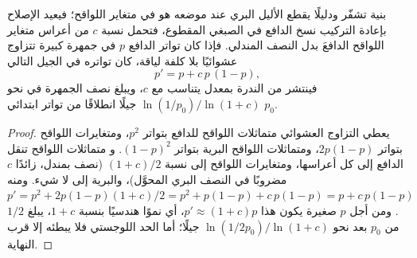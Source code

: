 \begin{theorem}\label{thm:b3:genetic-engineering:drive}
\emph{} بنية تشفّر  ودليلًا يقطع
الأليل البري عند موضعه هو في متغاير اللواقح؛ فيعيد الإصلاح
بإعادة التركيب نسخ الدافع في الصبغي المقطوع، فتحمل
نسبة $c$ من أعراس متغاير اللواقح الدافعَ بدل
النصف المندلي. فإذا كان تواتر الدافع $p$ في جمهرة كبيرة
تتزاوج عشوائيًا بلا كلفة لياقة، كان تواتره في
الجيل التالي
\[
p' = p + c\,p\,(1 - p),
\]
فينتشر من الندرة بمعدل يتناسب مع $c$، ويبلغ
نصف الجمهرة في نحو $\ln(1/p_{0})/\ln(1 + c)$
جيلًا انطلاقًا من تواتر ابتدائي $p_{0}$.
\end{theorem}
\begin{proof}
يعطي التزاوج العشوائي متماثلات اللواقح للدافع بتواتر $p^{2}$،
ومتغايرات اللواقح بتواتر $2p(1-p)$، ومتماثلات اللواقح البرية بتواتر $(1-p)^{2}$. و
متماثلات اللواقح تنقل الدافع إلى كل أعراسها، ومتغايرات اللواقح
إلى نسبة $(1 + c)/2$ (نصف بمندل، زائدًا $c$ مضروبًا في النصف
البري المحوَّل)، والبرية إلى لا شيء. ومنه $p' = p^{2} + 2p(1-p)(1+c)/2
= p^{2} + p(1-p) + c\,p(1-p) = p + c\,p(1-p)$. ومن أجل $p$ صغيرة يكون هذا
$p' \approx (1+c)p$، أي نموًا هندسيًا بنسبة $1 + c$، يبلغ
$1/2$ من $p_{0}$ بعد نحو $\ln(1/2p_{0})/\ln(1+c)$ جيلًا؛ أما
الحد اللوجستي فلا يبطئه إلا قرب النهاية.
\end{proof}

